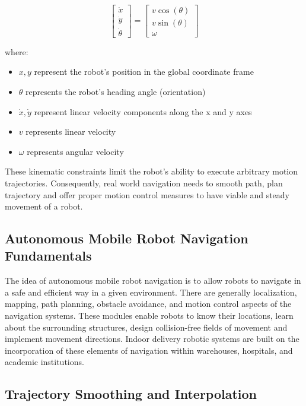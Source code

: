 \begin{equation}
\begin{bmatrix}
\dot{x} \\
\dot{y} \\
\dot{\theta}
\end{bmatrix}
=
\begin{bmatrix}
v \cos(\theta) \\
v \sin(\theta) \\
\omega
\end{bmatrix}
\end{equation}

where:
\begin{itemize}[noitemsep]
\item $x, y$ represent the robot's position in the global coordinate frame
\item $\theta$ represents the robot's heading angle (orientation)
\item $\dot{x}, \dot{y}$ represent linear velocity components along the x and y axes
\item $v$ represents linear velocity
\item $\omega$ represents angular velocity
\end{itemize}

These kinematic constraints limit the robot's ability to execute arbitrary motion trajectories. Consequently, real world navigation needs to smooth path, plan trajectory and offer proper motion control measures to have viable and steady movement of a robot.

\subsection{Autonomous Mobile Robot Navigation Fundamentals}



The idea of autonomous mobile robot navigation is to allow robots to navigate in a safe and efficient way in a given environment. There are generally localization, mapping, path planning, obstacle avoidance, and motion control aspects of the navigation systems. These modules enable robots to know their locations, learn about the surrounding structures, design collision-free fields of movement and implement movement directions. Indoor delivery robotic systems are built on the incorporation of these elements of navigation within warehouses, hospitals, and academic institutions.
\subsection{Trajectory Smoothing and Interpolation}

